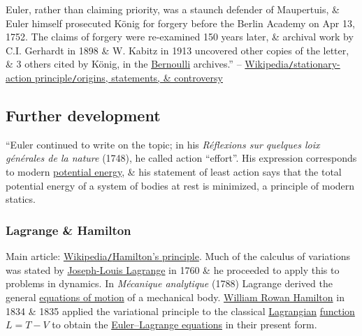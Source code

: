 \documentclass[oneside]{book}
\numberwithin{equation}{section}
\begin{document}
Euler, rather than claiming priority, was a staunch defender of Maupertuis, \& Euler himself prosecuted K\"onig for forgery before the Berlin Academy on Apr 13, 1752. The claims of forgery were re-examined 150 years later, \& archival work by C.I. Gerhardt in 1898 \& W. Kabitz in 1913 uncovered other copies of the letter, \& 3 others cited by K\"onig, in the \href{https://en.wikipedia.org/wiki/Bernoulli_family}{Bernoulli} archives.'' -- \href{https://en.wikipedia.org/wiki/Stationary-action_principle#Origins,_statements,_and_controversy}{Wikipedia\texttt{/}stationary-action principle\texttt{/}origins, statements, \& controversy}

\subsection{Further development}
``Euler continued to write on the topic; in his \textit{R\'eflexions sur quelques loix g\'en\'erales de la nature} (1748), he called action ``effort''. His expression corresponds to modern \href{https://en.wikipedia.org/wiki/Potential_energy}{potential energy}, \& his statement of least action says that the total potential energy of a system of bodies at rest is minimized, a principle of modern statics.

\subsubsection{Lagrange \& Hamilton}
Main article: \href{https://en.wikipedia.org/wiki/Hamilton%27s_principle}{Wikipedia\texttt{/}Hamilton's principle}. Much of the calculus of variations was stated by \href{https://en.wikipedia.org/wiki/Joseph-Louis_Lagrange}{Joseph-Louis Lagrange} in 1760 \& he proceeded to apply this to problems in dynamics. In \textit{M\'ecanique analytique} (1788) Lagrange derived the general \href{https://en.wikipedia.org/wiki/Lagrangian_equations_of_motion}{equations of motion} of a mechanical body. \href{https://en.wikipedia.org/wiki/William_Rowan_Hamilton}{William Rowan Hamilton} in 1834 \& 1835 applied the variational principle to the classical \href{https://en.wikipedia.org/wiki/Lagrangian_mechanics}{Lagrangian} \href{https://en.wikipedia.org/wiki/Function_(mathematics)}{function} $L = T - V$ to obtain the \href{https://en.wikipedia.org/wiki/Euler%E2%80%93Lagrange_equations}{Euler--Lagrange equations} in their present form.
\end{document}
